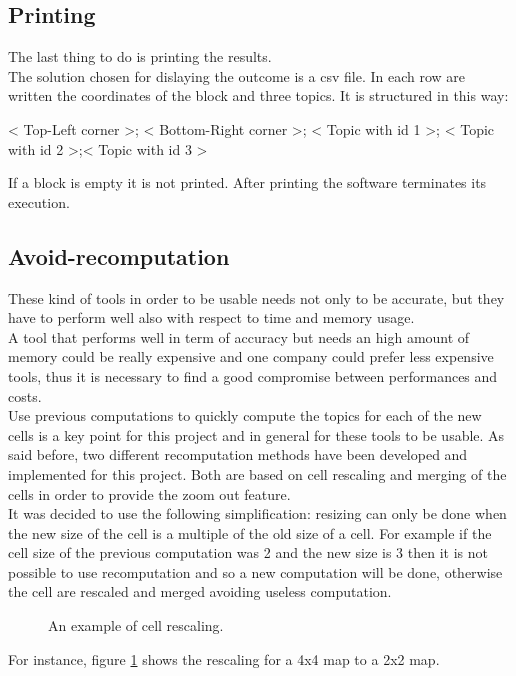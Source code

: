 \documentclass{sig-alternate-05-2015}
\begin{document}
\subsection{Printing}\label{printing}
The last thing to do is printing the results.\\
The solution chosen for dislaying the outcome is a csv file.
In each row are written the coordinates of the block and three topics. It is structured in this way:
\begin{center}
< Top-Left corner >; < Bottom-Right corner >; < Topic with id 1 >; < Topic with id 2 >;< Topic with id 3 >
\end{center}
If a block is empty it is not printed.
After printing the software terminates its execution.

\subsection{Avoid-recomputation}\label{avoidingRecomputation}
These kind of tools in order to be usable needs not only to be accurate, but they have to perform well
also with respect to time and memory usage. \\ A tool that performs well in term of accuracy but needs an high amount of memory could be really expensive and one company could prefer less expensive tools, thus it is necessary to find a good compromise between performances and costs. \\ Use previous computations to quickly compute the topics for each of the new cells is a key point for this project and in general for these tools to be usable. As said before, two different recomputation methods have been developed and implemented for this project. Both are based on cell rescaling and merging of the cells in order to provide the zoom out feature. \\ It was decided to use the following simplification: resizing can only be done when the new size of the cell is a multiple of the old size of a cell. For example if the cell size of the previous computation was 2 and the new size is 3 then it is not possible to use recomputation and so a new computation will be done, otherwise the cell are rescaled and merged avoiding useless computation.
\begin{figure}[h]
  \caption{An example of cell rescaling.}
  \label{resizeImg}
\end{figure}
\newline
For instance, figure \ref{resizeImg} shows the rescaling for a 4x4 map to a 2x2 map.
\end{document}
